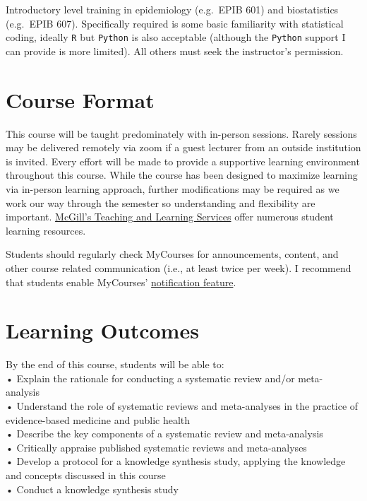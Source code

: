 \documentclass[
  letterpaper,
  DIV=11,
  numbers=noendperiod]{scrartcl}
\begin{document}
Introductory level training in epidemiology (e.g.~EPIB 601) and
biostatistics (e.g.~EPIB 607). Specifically required is some basic
familiarity with statistical coding, ideally \texttt{R} but
\texttt{Python} is also acceptable (although the \texttt{Python} support
I can provide is more limited). All others must seek the instructor's
permission.

\section{Course Format}\label{course-format}

This course will be taught predominately with in-person sessions. Rarely
sessions may be delivered remotely via zoom if a guest lecturer from an
outside institution is invited. Every effort will be made to provide a
supportive learning environment throughout this course. While the course
has been designed to maximize learning via in-person learning approach,
further modifications may be required as we work our way through the
semester so understanding and flexibility are important.
\href{https://www.mcgill.ca/tls/students}{McGill's Teaching and Learning
Services} offer numerous student learning resources.

Students should regularly check MyCourses for announcements, content,
and other course related communication (i.e., at least twice per week).
I recommend that students enable MyCourses'
\href{https://mcgill.service-now.com/itportal?id=kb_article&sysparm_article=KB001108}{notification
feature}.

\section{Learning Outcomes}\label{learning-outcomes}

By the end of this course, students will be able to:~\\
• Explain the rationale for conducting a systematic review and/or
meta-analysis~\\
• Understand the role of systematic reviews and meta-analyses in the
practice of evidence-based medicine and public health~\\
• Describe the key components of a systematic review and
meta-analysis~\\
• Critically appraise published systematic reviews and meta-analyses~\\
• Develop a protocol for a knowledge synthesis study, applying the
knowledge and concepts discussed in this course~\\
• Conduct a knowledge synthesis study~
\end{document}
